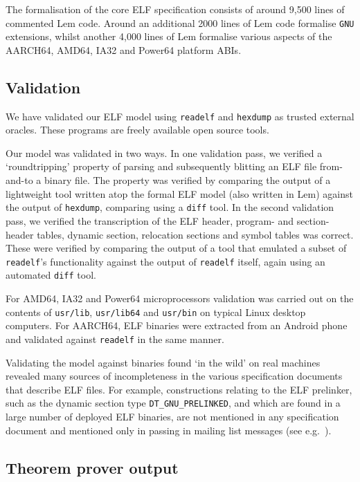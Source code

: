 The formalisation of the core ELF specification consists of around 9,500 lines of commented Lem code.
Around an additional 2000 lines of Lem code formalise \texttt{GNU} extensions, whilst another 4,000 lines of Lem formalise various aspects of the AARCH64, AMD64, IA32 and Power64 platform ABIs.

\subsection{Validation}
\label{subsect.elf.validation}

We have validated our ELF model using \texttt{readelf} and \texttt{hexdump} as trusted external oracles.
These programs are freely available open source tools.

Our model was validated in two ways.
In one validation pass, we verified a `roundtripping' property of parsing and subsequently blitting an ELF file from-and-to a binary file.
The property was verified by comparing the output of a lightweight tool written atop the formal ELF model (also written in Lem) against the output of \texttt{hexdump}, comparing using a \texttt{diff} tool.
In the second validation pass, we verified the transcription of the ELF header, program- and section-header tables, dynamic section, relocation sections and symbol tables was correct.
These were verified by comparing the output of a tool that emulated a subset of \texttt{readelf}'s functionality against the output of \texttt{readelf} itself, again using an automated \texttt{diff} tool.

For AMD64, IA32 and Power64 microprocessors validation was carried out on the contents of \texttt{usr/lib}, \texttt{usr/lib64} and \texttt{usr/bin} on typical Linux desktop computers.
For AARCH64, ELF binaries were extracted from an Android phone and validated against \texttt{readelf} in the same manner.

Validating the model against binaries found `in the wild' on real machines revealed many sources of incompleteness in the various specification documents that describe ELF files.
For example, constructions relating to the ELF prelinker, such as the dynamic section type \texttt{DT\_GNU\_PRELINKED}, and which are found in a large number of deployed ELF binaries, are not mentioned in any specification document and mentioned only in passing in mailing list messages (see e.g.~\cite{jelinek-prelinker-2001}).

\subsection{Theorem prover output}
\label{subsect.theorem.prover.output}

